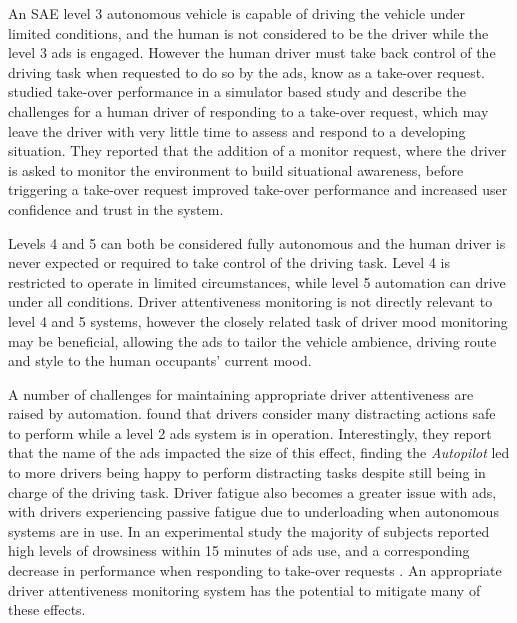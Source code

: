 \documentclass[11pt, parskip=half*,twoside=false]{scrbook}
\begin{document}
An SAE level 3 autonomous vehicle is capable of driving the vehicle under limited conditions, and the human is not considered to be the driver while the level 3 \gls{ads} is engaged. However the human driver must take back control of the driving task when requested to do so by the \gls{ads}, know as a take-over request.  \citet{luMereTakeoverRequests2019} studied take-over performance in a simulator based study and describe the challenges for a human driver of responding to a take-over request, which may leave the driver with very little time to assess and respond to a developing situation. They reported that the addition of a monitor request, where the driver is asked to monitor the environment to build situational awareness, before triggering a take-over request improved take-over performance and increased user confidence and trust in the system.

Levels 4 and 5 can both be considered fully autonomous and the human driver is never expected or required to take control of the driving task. Level 4 is restricted to operate in limited circumstances, while level 5 automation can drive under all conditions. Driver attentiveness monitoring is not directly relevant to level 4 and 5 systems, however the closely related task of driver mood monitoring may be beneficial, allowing the \gls{ads} to tailor the vehicle ambience, driving route and style to the human occupants' current mood.

A number of challenges for maintaining appropriate driver attentiveness are raised by automation. \citet{teohWhatNameDrivers2020} found that drivers consider many distracting actions safe to perform while a level 2 \gls{ads} system is in operation. Interestingly, they report that the name of the \gls{ads} impacted the size of this effect, finding the \emph{Autopilot} led to more drivers being happy to perform distracting tasks despite still being in charge of the driving task. Driver fatigue also becomes a greater issue with \gls{ads}, with drivers experiencing passive fatigue due to underloading when autonomous systems are in use. In an experimental study the majority of subjects reported high levels of drowsiness within 15 minutes of \gls{ads} use, and a corresponding decrease in performance when responding to take-over requests \citep{goncalvesDrowsinessConditionalAutomation2016}. An appropriate driver attentiveness monitoring system has the potential to mitigate many of these effects. 
\end{document}
